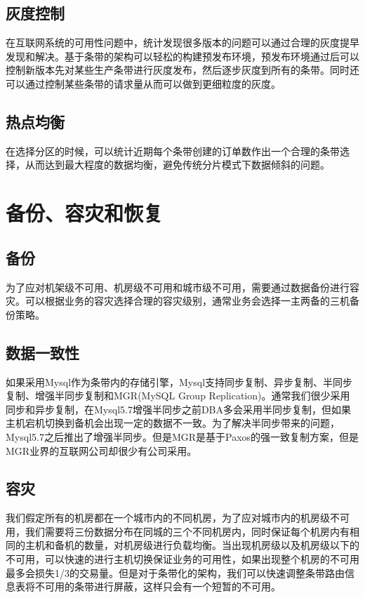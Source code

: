 \documentclass[letterpaper,twocolumn,10pt]{article}
\begin{document}
\subsection {灰度控制}
在互联网系统的可用性问题中，统计发现很多版本的问题可以通过合理的灰度提早发现和解决。基于条带的架构可以轻松的构建预发布环境，预发布环境通过后可以控制新版本先对某些生产条带进行灰度发布，然后逐步灰度到所有的条带。同时还可以通过控制某些条带的请求量从而可以做到更细粒度的灰度。

\subsection{热点均衡}
在选择分区的时候，可以统计近期每个条带创建的订单数作出一个合理的条带选择，从而达到最大程度的数据均衡，避免传统分片模式下数据倾斜的问题。

\section{备份、容灾和恢复}

\subsection{备份}
为了应对机架级不可用、机房级不可用和城市级不可用，需要通过数据备份进行容灾。可以根据业务的容灾选择合理的容灾级别，通常业务会选择一主两备的三机备份策略。

\subsection{数据一致性}
如果采用Mysql作为条带内的存储引擎，Mysql支持同步复制、异步复制、半同步复制、增强半同步复制和MGR(MySQL Group Replication)。通常我们很少采用同步和异步复制，在Mysql5.7增强半同步之前DBA多会采用半同步复制，但如果主机宕机切换到备机会出现一定的数据不一致。为了解决半同步带来的问题，Mysql5.7之后推出了增强半同步。但是MGR是基于Paxos的强一致复制方案，但是MGR业界的互联网公司却很少有公司采用。

\subsection {容灾}
我们假定所有的机房都在一个城市内的不同机房，为了应对城市内的机房级不可用，我们需要将三份数据分布在同城的三个不同机房内，同时保证每个机房内有相同的主机和备机的数量，对机房级进行负载均衡。当出现机房级以及机房级以下的不可用，可以快速的进行主机切换保证业务的可用性，如果出现整个机房的不可用最多会损失1/3的交易量。但是对于条带化的架构，我们可以快速调整条带路由信息表将不可用的条带进行屏蔽，这样只会有一个短暂的不可用。
\end{document}
